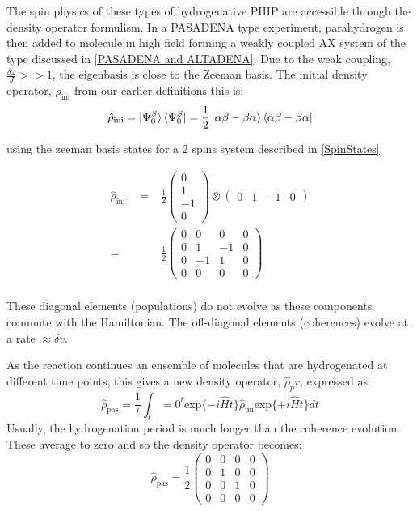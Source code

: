  The spin physics of these types of hydrogenative PHIP are
 accessible through the density operator formulism. In a PASADENA type experiment, parahydrogen is then added to molecule in high field forming a weakly coupled AX
 system of the type discussed in \ref{PASADENA and ALTADENA}. Due to the weak coupling, $\frac{\delta{\omega}}{J}>>1$, the eigenbasis is close to the Zeeman basis. The initial density operator, $\hat{\rho}_{\text{ini}}$ from our earlier
 definitions this is:
 \begin{equation}
   \hat{\rho}_{\text{ini}} = \ket{\Psi_{0}^{S}}\bra{\Psi_{0}^{S}} = \frac{1}{2}\ket{\alpha\beta -
   \beta\alpha}\bra{\alpha\beta - \beta\alpha}
 \end{equation}

 using the zeeman basis states for a 2 spins system described in \ref{SpinStates}

 \begin{align}
   \hat{\rho}_{\text{ini}}\quad=& \frac{1}{2} \begin{pmatrix}
   0\\
   1\\
   -1\\
   0
   \end{pmatrix} \otimes \begin{pmatrix}
     0 & 1 & -1 & 0
     \end{pmatrix}\\
   =& \frac{1}{2}\begin{pmatrix}
   0 & 0 & 0 & 0\\
   0 & 1 & -1 & 0\\
   0 & -1 & 1 & 0\\
   0 & 0 & 0 & 0
 \end{pmatrix} \\
 \end{align}

 These diagonal elements (populations) do not evolve as these components commute with the Hamiltonian. The off-diagonal
 elements (coherences) evolve at a rate $\approx\delta{v}$.

 As the reaction continues an ensemble of molecules that are hydrogenated at different time points, this gives
 a new density operator, $\hat{\rho}_pr$, expressed as:
 \begin{equation}
   \hat{\rho}_{\text{pas}} = \frac{1}{t} \int_t=0^t{\text{exp}\{-i\hat{H}t\}\hat{\rho}_{\text{ini}}\text{exp}\{+i\hat{H}t\}}dt
 \end{equation}
 Usually, the hydrogenation period is much longer than the coherence evolution. These average to zero and so the
 density operator becomes:
 \begin{equation}
   \hat{\rho}_{\text{pas}} = \frac{1}{2}\begin{pmatrix}
   0 & 0 & 0 & 0\\
   0 & 1 & 0 & 0\\
   0 & 0 & 1 & 0\\
   0 & 0 & 0 & 0
 \end{pmatrix}
 \end{equation}


